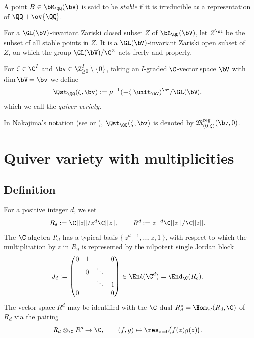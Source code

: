 \begin{Definition}\label{dfn:stable}
A point $B \in \bM_\QQ(\bV)$ is said to be {\em stable}
if it is irreducible as a representation of $\QQ + \ov{\QQ}$.
\end{Definition}

For a $\GL(\bV)$-invariant Zariski closed subset $Z$ of $\bM_\QQ(\bV)$,
let $Z^\st$ be the subset of all stable points in $Z$.
It is a $\GL(\bV)$-invariant Zariski open subset of $Z$,
on which the group $\GL(\bV)/\C^\times$ acts
freely and properly.

\begin{Definition}\label{dfn:q-variety}
For $\zeta \in \C^I$ and $\bv \in \Z_{\geq 0}^I \setminus \{ 0 \}$,
taking an $I$-graded $\C$-vector space $\bV$ with $\dim \bV = \bv$
we def\/ine
\[
\Qst_\QQ(\zeta,\bv) := \mu^{-1}(-\zeta\,\unit_\bV)^\st / \GL(\bV),
\]
which we call the {\em quiver variety}.
\end{Definition}

\begin{Remark}\label{rem:nakajima}
In Nakajima's notation (see \cite{MR1302318} or \cite{MR2023313}),
$\Qst_\QQ(\zeta,\bv)$ is denoted by
$\mathfrak{M}^\mathrm{reg}_{(0,\zeta)}(\bv,0)$.
\end{Remark}



\section{Quiver variety with multiplicities}\label{sec:q-multi}

\subsection{Def\/inition}\label{subsec:dfn}

For a positive integer $d$, we set
\[
R_d := \C[[z]]/z^d\C[[z]], \qquad R^d := z^{-d}\C[[z]]/\C[[z]].
\]
The $\C$-algebra $R_d$ has a typical basis $\{\, z^{d-1}, \dots ,z,1 \,\}$,
with respect to which
the multiplication by $z$ in $R_d$ is represented by
the nilpotent single Jordan block
\[
J_d := \begin{pmatrix}
                        0     & 1 &        & 0 \\
                              & 0 & \ddots &   \\
                              &   & \ddots & 1   \\
                        0     &   &        & 0 \end{pmatrix}
\in \End(\C^d)=\End_\C(R_d).
\]
The vector space $R^d$ may be identif\/ied with
the $\C$-dual $R_d^* =\Hom_\C (R_d,\C)$ of $R_d$ via the pairing
\[
R_d \otimes_\C R^d \to \C, \qquad (f,g) \mapsto
\res_{z=0} \bigl( f(z)g(z) \bigr).
\]

